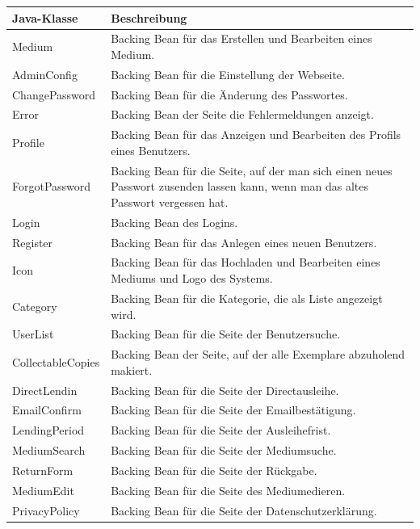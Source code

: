 \documentclass{article}
\begin{document}
 \begin{center}
    \begin{table}
        \begin{tabular} { |p{}|p{}| }
            \hline
            Java-Klasse & Beschreibung  \\
            \hline\hline
            Medium & Backing Bean für das Erstellen und Bearbeiten eines Medium. \\
            \hline
            AdminConfig & Backing Bean für die Einstellung der Webseite. \\
            \hline
            ChangePassword & Backing Bean für die Änderung des Passwortes. \\
            \hline
            Error & Backing Bean der Seite die Fehlermeldungen anzeigt.\\
            \hline
            Profile & Backing Bean für das Anzeigen und Bearbeiten des Profils eines Benutzers. \\
            \hline
            ForgotPassword & Backing Bean für die Seite, auf der man sich einen neues Passwort zusenden lassen kann, wenn man das altes Passwort vergessen hat. \\
             \hline
            Login & Backing Bean des Logins. \\
             \hline
            Register & Backing Bean für das Anlegen eines neuen Benutzers. \\
            \hline
            Icon & Backing Bean für das Hochladen und Bearbeiten eines Mediums und Logo des Systems. \\
            \hline
            Category & Backing Bean für die Kategorie, die als Liste angezeigt wird. \\
            \hline
            UserList & Backing Bean für die Seite der Benutzersuche. \\
            \hline
            CollectableCopies & Backing Bean der Seite, auf der alle Exemplare abzuholend makiert. \\
            \hline
            DirectLendin & Backing Bean für die Seite der Directausleihe. \\
             \hline
            EmailConfirm & Backing Bean für die Seite der Emailbestätigung. \\
             \hline
            LendingPeriod & Backing Bean für die Seite der Ausleihefrist. \\
             \hline
            MediumSearch & Backing Bean für die Seite der Mediumsuche. \\
             \hline
            ReturnForm & Backing Bean für die Seite der Rückgabe. \\
             \hline
            MediumEdit & Backing Bean für die Seite des Mediumedieren. \\
             \hline
            PrivacyPolicy & Backing Bean für die Seite der Datenschutzerklärung. \\
            \hline
        \end{tabular}
        \end{table}
        \end{center}
\end{document}
